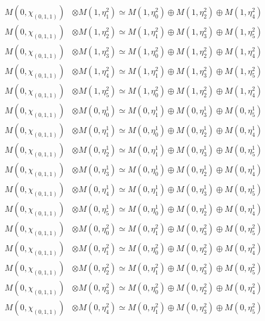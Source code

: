 \begin{align*}
M(0,\chi_{(0,1,1)}) &\otimes M(1,\eta^{2}_{1}) \simeq M(1,\eta^{2}_{0}) \oplus M(1,\eta^{2}_{2}) \oplus M(1,\eta^{2}_{4}) \\
M(0,\chi_{(0,1,1)}) &\otimes M(1,\eta^{2}_{2}) \simeq M(1,\eta^{2}_{1}) \oplus M(1,\eta^{2}_{3}) \oplus M(1,\eta^{2}_{5}) \\
M(0,\chi_{(0,1,1)}) &\otimes M(1,\eta^{2}_{3}) \simeq M(1,\eta^{2}_{0}) \oplus M(1,\eta^{2}_{2}) \oplus M(1,\eta^{2}_{4}) \\
M(0,\chi_{(0,1,1)}) &\otimes M(1,\eta^{2}_{4}) \simeq M(1,\eta^{2}_{1}) \oplus M(1,\eta^{2}_{3}) \oplus M(1,\eta^{2}_{5}) \\
M(0,\chi_{(0,1,1)}) &\otimes M(1,\eta^{2}_{5}) \simeq M(1,\eta^{2}_{0}) \oplus M(1,\eta^{2}_{2}) \oplus M(1,\eta^{2}_{4}) \\
M(0,\chi_{(0,1,1)}) &\otimes M(0,\eta^{1}_{0}) \simeq M(0,\eta^{1}_{1}) \oplus M(0,\eta^{1}_{3}) \oplus M(0,\eta^{1}_{5}) \\
M(0,\chi_{(0,1,1)}) &\otimes M(0,\eta^{1}_{1}) \simeq M(0,\eta^{1}_{0}) \oplus M(0,\eta^{1}_{2}) \oplus M(0,\eta^{1}_{4}) \\
M(0,\chi_{(0,1,1)}) &\otimes M(0,\eta^{1}_{2}) \simeq M(0,\eta^{1}_{1}) \oplus M(0,\eta^{1}_{3}) \oplus M(0,\eta^{1}_{5}) \\
M(0,\chi_{(0,1,1)}) &\otimes M(0,\eta^{1}_{3}) \simeq M(0,\eta^{1}_{0}) \oplus M(0,\eta^{1}_{2}) \oplus M(0,\eta^{1}_{4}) \\
M(0,\chi_{(0,1,1)}) &\otimes M(0,\eta^{1}_{4}) \simeq M(0,\eta^{1}_{1}) \oplus M(0,\eta^{1}_{3}) \oplus M(0,\eta^{1}_{5}) \\
M(0,\chi_{(0,1,1)}) &\otimes M(0,\eta^{1}_{5}) \simeq M(0,\eta^{1}_{0}) \oplus M(0,\eta^{1}_{2}) \oplus M(0,\eta^{1}_{4}) \\
M(0,\chi_{(0,1,1)}) &\otimes M(0,\eta^{2}_{0}) \simeq M(0,\eta^{2}_{1}) \oplus M(0,\eta^{2}_{3}) \oplus M(0,\eta^{2}_{5}) \\
M(0,\chi_{(0,1,1)}) &\otimes M(0,\eta^{2}_{1}) \simeq M(0,\eta^{2}_{0}) \oplus M(0,\eta^{2}_{2}) \oplus M(0,\eta^{2}_{4}) \\
M(0,\chi_{(0,1,1)}) &\otimes M(0,\eta^{2}_{2}) \simeq M(0,\eta^{2}_{1}) \oplus M(0,\eta^{2}_{3}) \oplus M(0,\eta^{2}_{5}) \\
M(0,\chi_{(0,1,1)}) &\otimes M(0,\eta^{2}_{3}) \simeq M(0,\eta^{2}_{0}) \oplus M(0,\eta^{2}_{2}) \oplus M(0,\eta^{2}_{4}) \\
M(0,\chi_{(0,1,1)}) &\otimes M(0,\eta^{2}_{4}) \simeq M(0,\eta^{2}_{1}) \oplus M(0,\eta^{2}_{3}) \oplus M(0,\eta^{2}_{5}) \\

\end{align*}

